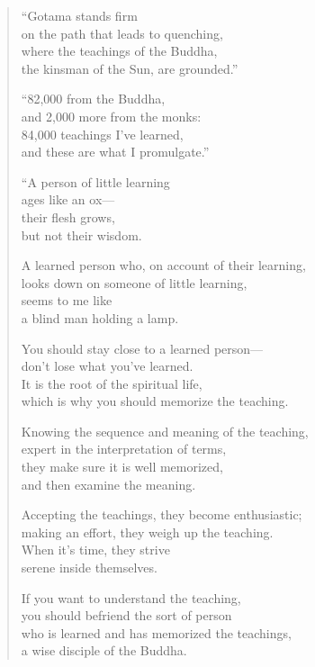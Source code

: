 \documentclass[12pt,openany]{book}%
\begin{document}
\begin{verse}
“Gotama stands firm \\
on the path that leads to quenching, \\
where the teachings of the Buddha, \\
the kinsman of the Sun, are grounded.” 

“82,000 from the Buddha, \\
and 2,000 more from the monks: \\
84,000 teachings I’ve learned, \\
and these are what I promulgate.” 

“A person of little learning \\
ages like an ox—\\
their flesh grows, \\
but not their wisdom. 

A learned person who, on account of their learning, \\
looks down on someone of little learning, \\
seems to me like \\
a blind man holding a lamp. 

You should stay close to a learned person—\\
don’t lose what you’ve learned. \\
It is the root of the spiritual life, \\
which is why you should memorize the teaching. 

Knowing the sequence and meaning of the teaching, \\
expert in the interpretation of terms, \\
they make sure it is well memorized, \\
and then examine the meaning. 

Accepting the teachings, they become enthusiastic; \\
making an effort, they weigh up the teaching. \\
When it’s time, they strive \\
serene inside themselves. 

If you want to understand the teaching, \\
you should befriend the sort of person \\
who is learned and has memorized the teachings, \\
a wise disciple of the Buddha. 


\end{verse}
\end{document}
